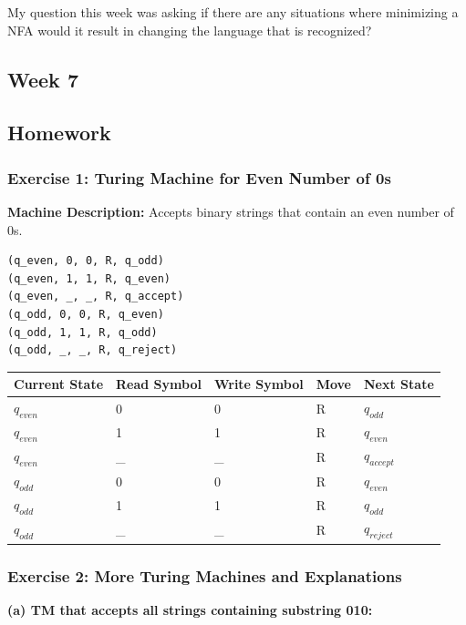 \documentclass{article}
\theoremstyle{theorem}
\theoremstyle{definition}
\theoremstyle{remark}
\begin{document}
My question this week was asking if there are any situations where minimizing a NFA would it result in changing the language that is recognized?


\subsection{Week 7}
\smallskip


\subsection*{Homework}

\subsubsection*{Exercise 1: Turing Machine for Even Number of 0s}

\textbf{Machine Description:} Accepts binary strings that contain an even number of 0s.

\begin{lstlisting}
(q_even, 0, 0, R, q_odd)
(q_even, 1, 1, R, q_even)
(q_even, _, _, R, q_accept)
(q_odd, 0, 0, R, q_even)
(q_odd, 1, 1, R, q_odd)
(q_odd, _, _, R, q_reject)
\end{lstlisting}

\begin{center}
\begin{tabular}{|l|l|l|l|l|}
\hline
Current State & Read Symbol & Write Symbol & Move & Next State \\
\hline
$q_{even}$ & 0 & 0 & R & $q_{odd}$ \\
$q_{even}$ & 1 & 1 & R & $q_{even}$ \\
$q_{even}$ & \_ & \_ & R & $q_{accept}$ \\
$q_{odd}$ & 0 & 0 & R & $q_{even}$ \\
$q_{odd}$ & 1 & 1 & R & $q_{odd}$ \\
$q_{odd}$ & \_ & \_ & R & $q_{reject}$ \\
\hline
\end{tabular}
\end{center}

\subsubsection*{Exercise 2: More Turing Machines and Explanations}

\textbf{(a) TM that accepts all strings containing substring 010:}
\end{document}
